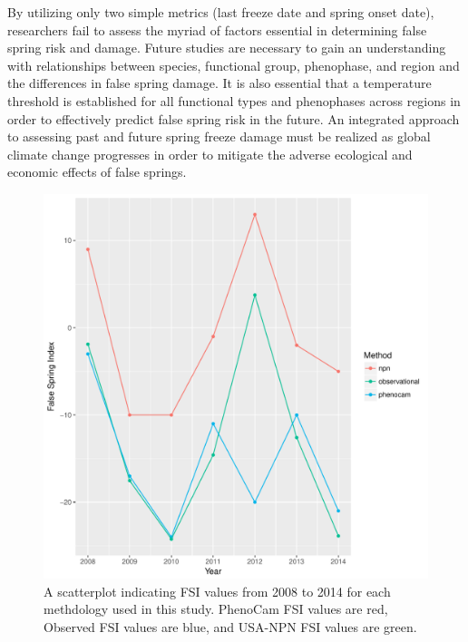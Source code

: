 \documentclass{article}\usepackage[]{graphicx}\usepackage[]{color}
\makeatletter
\def\maxwidth{ %
  \ifdim\Gin@nat@width>\linewidth
    \linewidth
  \else
    \Gin@nat@width
  \fi
}
\makeatother
\begin{document}
By utilizing only two simple metrics (last freeze date and spring onset date), researchers fail to assess the myriad of factors essential in determining false spring risk and damage. Future studies are necessary to gain an understanding with relationships between species, functional group, phenophase, and region and the differences in false spring damage. It is also essential that a temperature threshold is established for all functional types and phenophases across regions in order to effectively predict false spring risk in the future. An integrated approach to assessing past and future spring freeze damage must be realized as global climate change progresses in order to mitigate the adverse ecological and economic effects of false springs.



\begin{figure}[H]
\includegraphics[width=\maxwidth]{figure/fsifig-1} \caption[A scatterplot indicating FSI values from 2008 to 2014 for each methdology used in this study]{A scatterplot indicating FSI values from 2008 to 2014 for each methdology used in this study. PhenoCam FSI values are red, Observed FSI values are blue, and USA-NPN FSI values are green.}\label{fig:fsifig}
\end{figure}
\end{document}
